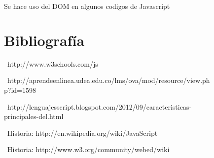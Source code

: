 \documentclass[11pt]{article} %
\begin{document}
\begin{figure}
\begin{center}
Se hace uso del DOM en algunos codigos de Javascript

\end{center}


\section{Bibliografía}


\  {http://www.w3schools.com/js }

\  {http://aprendeenlinea.udea.edu.co/lms/ova/mod/resource/view.php?id=1598 }

\  {http://lenguajesscript.blogspot.com/2012/09/caracteristicas-principales-del.html }

\ {Historia: http://en.wikipedia.org/wiki/JavaScript} 

\ {Historia: http://www.w3.org/community/webed/wiki}
\end{figure}


\lstset{language=Pascal}          %
\end{document}
